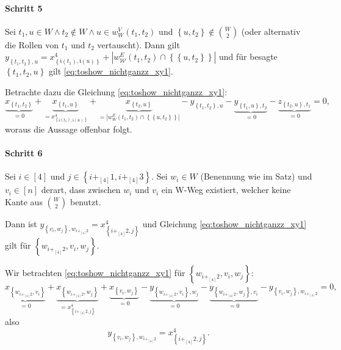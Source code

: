 \documentclass[10p,a4paper,BCOR = 12mm, DIV=15]{scrbook}
\begin{document}
{\begin{bew}
\paragraph{Schritt 5} Sei $t_1, u \in W \wedge t_2 \notin W \wedge u \in w_W^V\left(t_1, t_2\right)$ und $\left\{u, t_2\right\} \notin {W \choose 2}$ (oder alternativ die Rollen von $t_1$ und $t_2$ vertauscht). Dann gilt $y_{\left\{t_1, t_2\right\}, u} = x^{4}_{\left\{\mathfrak{i}\left(t_1\right), \mathfrak{i}\left(u\right)\right\}} + \left|w_{\mathcal{W}}^E\left(t_1, t_2\right) \cap \left\{\left\{u, t_2\right\}\right\}\right|$ und für besagte $\left\{t_1, t_2, u\right\}$ gilt \eqref{eq:toshow_nichtganzz_xy1}.

Betrachte dazu die Gleichung \eqref{eq:toshow_nichtganzz_xy1}:
\begin{displaymath}
\underbrace{x_{\left\{t_1, t_2\right\}}}_{= 0} + \underbrace{x_{\left\{t_1, u\right\}}}_{= x^4_{\left\{\mathfrak{i}\left(t_1\right), \mathfrak{i}\left(u\right)\right\}}} + \underbrace{x_{\left\{t_2, u\right\}}}_{= \left|w_W^E\left(t_1, t_2\right) \cap \left\{\left\{u, t_2\right\}\right\}\right|} - y_{\left\{t_1, t_2\right\}, u} - \underbrace{y_{\left\{t_1, u\right\}, t_2}}_{= 0} - \underbrace{z_{\left\{t_2, u\right\}, t_1}}_{= 0} = 0,
\end{displaymath} 
woraus die Aussage offenbar folgt.

\paragraph{Schritt 6} Sei $i \in \left[4\right]$ und $j \in \left\{i +_{\left[4\right]} 1, i +_{\left[4\right]} 3\right\}$. Sei $w_i \in W$ (Benennung wie im Satz) und $v_i \in \left[n\right]$ derart, dass zwischen $w_i$ und $v_i$ ein W-Weg existiert, welcher keine Kante aus ${W \choose 2}$ benutzt.

Dann ist $y_{\left\{v_i, w_j\right\}, w_{i+_{\left[4\right]} 2}} = x^{4}_{\left\{i+_{\left[4\right]} 2, j\right\}}$ und Gleichung \eqref{eq:toshow_nichtganzz_xy1} gilt für $\left\{w_{i+_{\left[4\right]} 2}, v_i, w_j\right\}$.

Wir betrachten \eqref{eq:toshow_nichtganzz_xy1} für $\left\{w_{i+_{\left[4\right]} 2}, v_i, w_j\right\}$:
\begin{displaymath}
\underbrace{x_{\left\{w_{i+_{\left[4\right]} 2}, v_i\right\}}}_{= 0} + \underbrace{x_{\left\{w_{i+_{\left[4\right]} 2}, w_j\right\}}}_{= x^{4}_{\left\{i+_{\left[4\right]} 2, j\right\}}} + \underbrace{x_{\left\{v_i, w_j\right\}}}_{= 0}
- \underbrace{y_{\left\{w_{i+_{\left[4\right]} 2}, v_i\right\}, w_j}}_{= 0} - \underbrace{y_{\left\{w_{i+_{\left[4\right]} 2}, w_j\right\}, v_i}}_{= 0} - y_{\left\{v_i, w_j\right\}, w_{i+_{\left[4\right]} 2}} = 0,
\end{displaymath}
also
\begin{equation}
y_{\left\{v_i, w_j\right\}, w_{i+_{\left[4\right]} 2}} = x^{4}_{\left\{i+_{\left[4\right]} 2, j\right\}}. \label{eq:y_v_i, w_j__w_iplus2}
\end{equation}



\end{bew}}
\end{document}
